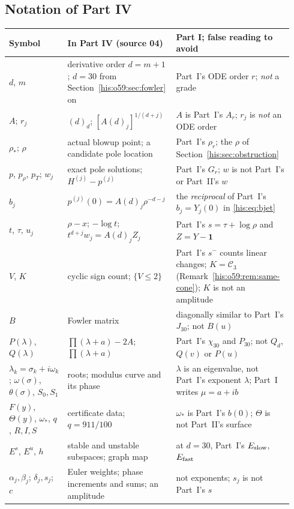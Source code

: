 \documentclass[11pt]{article}
\theoremstyle{remark}\newtheorem{remark}[theorem]{Remark}
\newcommand{\la}{\lambda}
\numberwithin{equation}{section}
\begin{document}
\subsection{Notation of Part IV}\label{his:o59:sec:notation}
\begin{center}\footnotesize
\begin{tabular}{@{}>{\raggedright\arraybackslash}p{0.15\linewidth}>{\raggedright\arraybackslash}p{0.38\linewidth}>{\raggedright\arraybackslash}p{0.41\linewidth}@{}}
\toprule
Symbol & In Part IV (source 04) & Part I; false reading to avoid\\
\midrule
$d$, $m$ & derivative order $d=m+1$; $d=30$ from Section~\ref{his:o59:sec:fowler} on & Part~I's ODE order $r$; \emph{not} a grade\\
$A$; $r_j$ & $(d)_d$; $[A(d)_j]^{1/(d+j)}$ & $A$ is Part~I's $A_r$; $r_j$ is \emph{not} an ODE order\\
$\rho_*$; $\rho$ & actual blowup point; a candidate pole location & Part~I's $\rho_r$; the $\rho$ of Section~\ref{his:sec:obstruction}\\
$p$, $p_\rho$, $p_T$; $w_j$ & exact pole solutions; $H^{(j)}-p^{(j)}$ & Part~I's $G_r$; $w$ is not Part~I's or Part~II's $w$\\
$b_j$ & $p^{(j)}(0)=A(d)_j\rho^{-d-j}$ & the \emph{reciprocal} of Part~I's $b_j=Y_j(0)$ in \eqref{his:eq:bjet}\\
$t$, $\tau$, $u_j$ & $\rho-x$; $-\log t$; $t^{d+j}w_j=A(d)_jZ_j$ & Part~I's $s=\tau+\log\rho$ and $Z=Y-\mathbf 1$\\
$V$, $K$ & cyclic sign count; $\{V\le2\}$ & Part~I's $s^-$ counts linear changes; $K=\mathcal C_3$ (Remark~\ref{his:o59:rem:same-cone}); $K$ is not an amplitude\\
$B$ & Fowler matrix & diagonally similar to Part~I's $J_{30}$; not $B(u)$\\
$P(\lambda)$, $Q(\lambda)$ & $\prod(\lambda+a)-2A$; $\prod(\lambda+a)$ & Part~I's $\chi_{30}$ and $P_{30}$; not $Q_d$, $Q(v)$ or $P(u)$\\
$\lambda_k=\sigma_k+i\omega_k$; $\omega(\sigma)$, $\theta(\sigma)$, $S_0,S_1$ & roots; modulus curve and its phase & $\lambda$ is an eigenvalue, not Part~I's exponent $\la$; Part~I writes $\mu=a+ib$\\
$F(y)$, $\Theta(y)$, $\omega_*$, $q$, $R,I,S$ & certificate data; $q=911/100$ & $\omega_*$ is Part~I's $b(0)$; $\Theta$ is not Part~II's surface\\
$E^s$, $E^u$, $h$ & stable and unstable subspaces; graph map & at $d=30$, Part~I's $E_{\rm slow}$, $E_{\rm fast}$\\
$\alpha_j,\beta_j$; $\delta_j,s_j$; $c$ & Euler weights; phase increments and sums; an amplitude & not exponents; $s_j$ is not Part~I's $s$\\
\bottomrule
\end{tabular}
\end{center}
\end{document}
